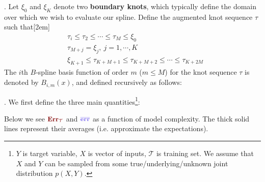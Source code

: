 \documentclass[11pt]{article}
\begin{document}
\myspace
\p {}. Let $\xi_0$ and $\xi_K$ denote two \textbf{boundary knots}, which typically define the domain over which we wish to evaluate our spline. Define the augmented knot sequence $\tau$ such that[2em]
\begin{align}
&\tau_i \le \tau_2 \le \cdots \le \tau_M \le \xi_0 \\
&\tau_{M + j} = \xi_j, ~ j = 1, \cdots, K \\
&\xi_{K + 1} \le \tau_{K + M + 1} \le \tau_{K + M + 2} \le \cdots \le \tau_{K + 2M}
\end{align}
The $i$th $B$-spline basis function of order $m$ ($m \le M$) for the knot sequence $\tau$ is denoted by $B_{i,m}(x)$, and defined recursively as follows:




\p {}. We first define the three main quantities\footnote{$Y$ is target variable, $X$ is vector of inputs, $\mathcal T$ is training set. We assume that $X$ and $Y$ can be sampled from some true/underlying/unknown joint distribution $p(X, Y)$.}:

Below we see $\mred{\text{Err}_{\mathcal{T}}}$ and $\mblue{\overline{\text{err}}}$ as a function of model complexity. The thick solid lines represent their averages (i.e. approximate the expectations). 
\end{document}
